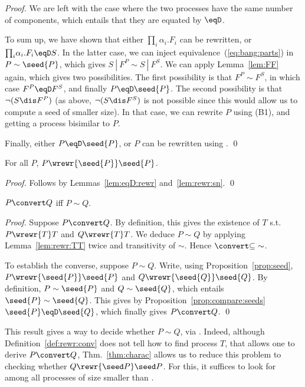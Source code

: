 \documentclass{llncs}
\begin{document}
\begin{proof}
We are left with the case where the two processes have the same number
of components, which entails that they are equated by $\eqD$.

To sum up, we have shown that either $\prod_i \!\alpha_i.F_i$ can be
rewritten, or $\prod_i\!\alpha_i.F_i\eqD S$. In the latter case, we can
inject equivalence~(\ref{eq:bang:parts}) in
$P\sim\seed{P}$, which gives
$S~|~F^P\sim S~|~F^S$. We can apply Lemma~\ref{lem:FF} again,
which gives two possibilities. The first possibility is that
$F^P\sim F^S$, in which case $F^P\eqD F^S$, and finally
$P\eqD \seed{P}$. The second possibility is that $\neg(S\dis F^P)$ (as above,
$\neg(S\dis F^S)$ is not possible since this would allow us to compute
a seed of smaller size). In that case, we can 
rewrite $P$ using (B1), and getting a process bisimilar to $P$.

Finally, either $P\eqD \seed{P}$, or $P$ can be rewritten using
.
\qed
\end{proof}

\begin{prop}\label{prop:seed}
  For all $P$, $P\wrewr{\seed{P}}\seed{P}$.
\end{prop}
\begin{proof}
  Follows by Lemmas~\ref{lem:eqD:rewr} and~\ref{lem:rewr:sn}.
\qed
\end{proof}

\begin{thm}[Characterisation]\label{thm:charac}
  $P\convert Q$ iff $P\sim Q$.
\end{thm}
\begin{proof}
  Suppose $P\convert Q$. By definition, this gives the existence of
  $T$ s.t.\ $P\wrewr{T}T$ and $Q\wrewr{T}T$. We deduce $P\sim Q$ by
  applying Lemma~\ref{lem:rewr:TT} twice and transitivity of $\sim$.
  Hence $\convert\protect{\subseteq}\sim$.
  
  To establish the converse, suppose $P\sim Q$. Write, using
  Proposition~\ref{prop:seed}, $P\wrewr{\seed{P}}\seed{P}$ and
  $Q\wrewr{\seed{Q}}\seed{Q}$. By definition, $P\sim\seed{P}$ and
  $Q\sim\seed{Q}$, which entails $\seed{P}\sim\seed{Q}$.
This gives by Proposition~\ref{prop:compare:seeds}
  $\seed{P}\eqD\seed{Q}$, which finally gives $P\convert Q$.
\qed
\end{proof}

This result gives a way to decide whether $P\sim Q$, via
\convert. Indeed, although Definition~\ref{def:rewr:conv} does not
tell how to find process $T$, that allows one to derive $P\convert Q$,
Thm.~\ref{thm:charac} allows us to reduce this problem to checking
whether $Q\rewr{\seed P}\seed P$. For this, it suffices to look for
 among all processes of size smaller than .
\end{document}
